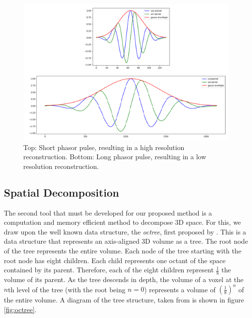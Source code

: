 \documentclass[conference]{IEEEtran}
\begin{document}
\begin{figure}
    \centering
    \includegraphics[width=\columnwidth]{figures/phasor_pulse_short_long.png}
    \caption{Top: Short phasor pulse, resulting in a high resolution reconstruction. Bottom: Long phasor pulse, resulting in a low resolution reconstruction.}
    \label{fig:long_short_pulse}
\end{figure}


\subsection{Spatial Decomposition}

The second tool that must be developed for our proposed method is a computation and memory efficient method to decompose 3D space. For this, we draw upon the well known data structure, the \textit{octree}, first proposed by \cite{octree}. This is a data structure that represents an axis-aligned 3D volume as a tree. The root node of the tree represents the entire volume. Each node of the tree starting with the root node has eight children. Each child represents one octant of the space contained by its parent. Therefore, each of the eight children represent $\frac{1}{8}$ the volume of its parent. As the tree descends in depth, the volume of a voxel at the $n$th level of the tree (with the root being $n=0$) represents a volume of $(\frac{1}{8})^n$ of the entire volume. A diagram of the tree structure, taken from \cite{Laurmaa2016} is shown in figure \ref{fig:octree}.
\end{document}
